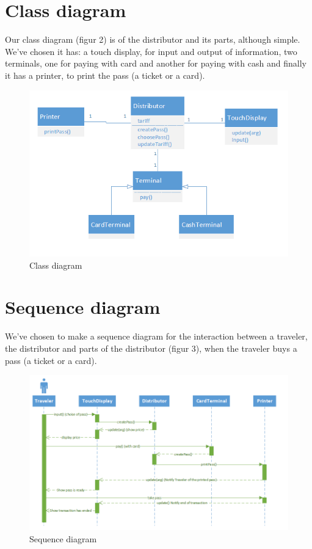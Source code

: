 \documentclass[pdftex,12pt,a4paper]{article}
\begin{document}
\section{Class diagram}
Our class diagram (figur 2) is of the distributor and its parts, although simple. We've chosen it has: a touch display, for input and output of information, two terminals, one for paying with card and another for paying with cash and finally it has a printer, to print the pass (a ticket or a card).
\begin{figure}[h]
\centering
\includegraphics[scale = 0.9]{class.png}
\caption{Class diagram}
\end{figure}

\pagebreak

\section{Sequence diagram}
We've chosen to make a sequence diagram for the  interaction between a traveler, the distributor and parts of the distributor (figur 3), when the traveler buys a pass (a ticket or a card).
\begin{figure}[h]
\centering
\includegraphics[scale = 0.7]{sequence.png}
\caption{Sequence diagram}
\end{figure}
\end{document}
